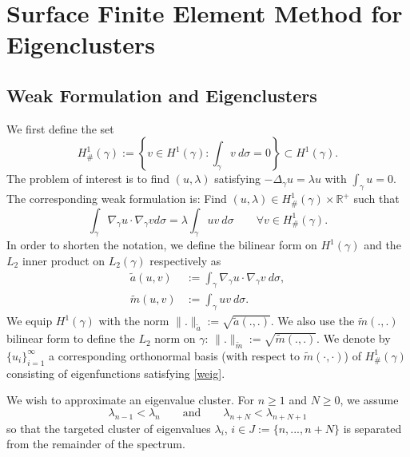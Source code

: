 \documentclass{siamart0516}
\numberwithin{equation}{section}
\numberwithin{theorem}{section}
\numberwithin{figure}{section}
\begin{document}
\section{Surface Finite Element Method for Eigenclusters} \label{sec2}

\subsection{Weak Formulation and Eigenclusters}
We first define the set 
$$
H^1_\#(\gamma) := \left\{v\in H^1(\gamma): \int_\gamma v ~ d\sigma = 0\right\} \subset H^1(\gamma).
$$
The problem of interest is to find $(u,\lambda)$ satisfying $-\Delta_\gamma u = \lambda u$ with $\int_\gamma u=0$.  The corresponding weak formulation is:  Find $(u,\lambda)\in H^1_\#(\gamma) \times \mathbb{R}^+$ such that
\begin{equation}\label{weig}
\int_{\gamma}\nabla_{\gamma} u \cdot \nabla_{\gamma} v d\sigma
=
\lambda \int_{\gamma}uv ~ d\sigma \qquad \forall v\in H^1_\#(\gamma).
\end{equation}
In order to shorten the notation, we define the bilinear form on $H^1(\gamma)$ and the $L_2$ inner product on $L_2(\gamma)$ respectively as 
\begin{align}\label{d:a}
\tilde a(u,v) &:=\int_{\gamma}\nabla_{\gamma} u \cdot \nabla_{\gamma} v ~ d\sigma,
\\
\label{d:m}
\tilde m(u,v) &:= \int_{\gamma}uv ~ d\sigma.
\end{align}
We equip $H^1(\gamma)$ with the norm $\|.\|_{\tilde a} := \sqrt{\tilde a(.,.)}$.%
We also use the $\tilde m(.,.)$ bilinear form to define the $L_2$ norm on $\gamma$: $\|.\|_{\tilde m} := \sqrt{\tilde m(.,.)}$.  We denote by $\{u_i\}_{i=1}^\infty$ a corresponding orthonormal basis (with respect to $\tilde m(\cdot, \cdot)$) of $H^1_\#(\gamma)$ consisting of eigenfunctions satisfying \eqref{weig}.



We wish to approximate an eigenvalue cluster.  For $n \ge 1$ and $N \ge 0$, we assume  
\begin{equation}\label{a:separation}
\lambda_{n-1} < \lambda_n \qquad \textrm{and} \qquad  \lambda_{n+N} < \lambda_{n+N+1}
\end{equation}
so that the targeted cluster of eigenvalues $\lambda_i$, $i\in J:=\{n, ..., n+N\}$ is separated from the remainder of the spectrum. 
\end{document}
